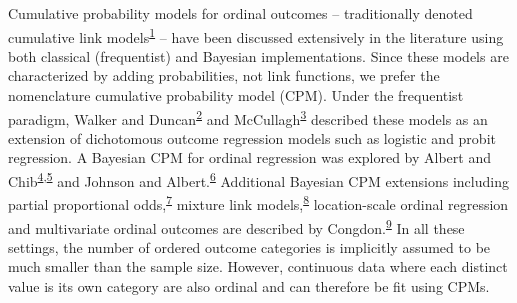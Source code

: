 \documentclass[
]{article}
\begin{document}
Cumulative probability models for ordinal outcomes -- traditionally denoted cumulative link models\textsuperscript{\protect\hyperlink{ref-agresti_categorical_2002}{1}} -- have been discussed extensively in the literature using both classical (frequentist) and Bayesian implementations. Since these models are characterized by adding probabilities, not link functions, we prefer the nomenclature cumulative probability model (CPM). Under the frequentist paradigm, Walker and Duncan\textsuperscript{\protect\hyperlink{ref-walker_estimation_1967}{2}} and McCullagh\textsuperscript{\protect\hyperlink{ref-peter_mccullagh_regression_1980}{3}} described these models as an extension of dichotomous outcome regression models such as logistic and probit regression. A Bayesian CPM for ordinal regression was explored by Albert and Chib\textsuperscript{\protect\hyperlink{ref-albert_bayesian_1993}{4},\protect\hyperlink{ref-albert_bayesian_1997}{5}} and Johnson and Albert.\textsuperscript{\protect\hyperlink{ref-johnson_ordinal_1999}{6}} Additional Bayesian CPM extensions including partial proportional odds,\textsuperscript{\protect\hyperlink{ref-peterson_partial_1990}{7}} mixture link models,\textsuperscript{\protect\hyperlink{ref-lang_bayesian_1999}{8}} location-scale ordinal regression and multivariate ordinal outcomes are described by Congdon.\textsuperscript{\protect\hyperlink{ref-congdon_bayesian_2005}{9}} In all these settings, the number of ordered outcome categories is implicitly assumed to be much smaller than the sample size. However, continuous data where each distinct value is its own category are also ordinal and can therefore be fit using CPMs.
\end{document}

